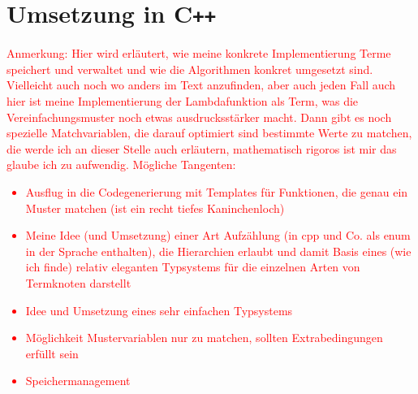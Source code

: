 \documentclass{scrartcl}
\begin{document}
\section{Umsetzung in C\texttt{++}}
\textcolor{red}{
\begin{itshape}
Anmerkung: Hier wird erläutert, wie meine konkrete Implementierung Terme speichert und verwaltet und wie die Algorithmen konkret umgesetzt sind. Vielleicht auch noch wo anders im Text anzufinden, aber auch jeden Fall auch hier ist meine Implementierung der Lambdafunktion als Term, was die Vereinfachungsmuster noch etwas ausdrucksstärker macht. Dann gibt es noch spezielle Matchvariablen, die darauf optimiert sind bestimmte Werte zu matchen, die werde ich an dieser Stelle auch erläutern, mathematisch rigoros ist mir das glaube ich zu aufwendig.
Mögliche Tangenten:
\begin{itemize}
\item {Ausflug in die Codegenerierung mit Templates für Funktionen, die genau ein Muster matchen (ist ein recht tiefes Kaninchenloch)}
\item {Meine Idee (und Umsetzung) einer Art Aufzählung (in cpp und Co. als enum in der Sprache enthalten), die Hierarchien erlaubt und damit Basis eines (wie ich finde) relativ eleganten Typsystems für die einzelnen Arten von Termknoten darstellt}
\item {Idee und Umsetzung eines sehr einfachen Typsystems}
\item{Möglichkeit Mustervariablen nur zu matchen, sollten Extrabedingungen erfüllt sein}
\item {Speichermanagement}
\end{itemize}
\end{itshape}
}
\end{document}

